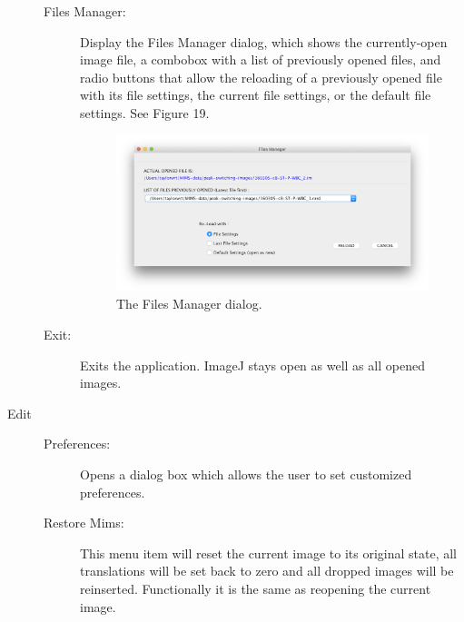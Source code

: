 \documentclass{article}
\begin{document}
\begin{description}
\begin{description}
	\item[Files Manager:] Display the Files Manager dialog, which shows the currently-open image file, a combobox with a list of previously opened files, and radio buttons that allow the reloading of a previously opened file with its file settings, the current file settings, or the default file settings.   See Figure 19.
	
	\begin{figure}[ht]
	\centering
	\includegraphics[scale=0.70]{snapshotFilesManager.png}
	\caption{ The Files Manager dialog.}
	\end{figure}
	
	\item[Exit:] Exits the application. ImageJ stays open as well as all opened images.  
	
	\end{description}
	
	
	\vspace{40mm}
	
	\item[\large{Edit}] \indent                       
	
	\begin{description}
	
	\item[Preferences:] Opens a dialog box which allows the user to set customized preferences.
	
	\item[Restore Mims:] This menu item will reset the current image to its
	original state, all translations will be set back to zero and all dropped images will be
	reinserted. Functionally it is the same as reopening the current image. 
	
	\end{description}
	
	\vspace{5mm}
	

\end{description}
\end{document}
